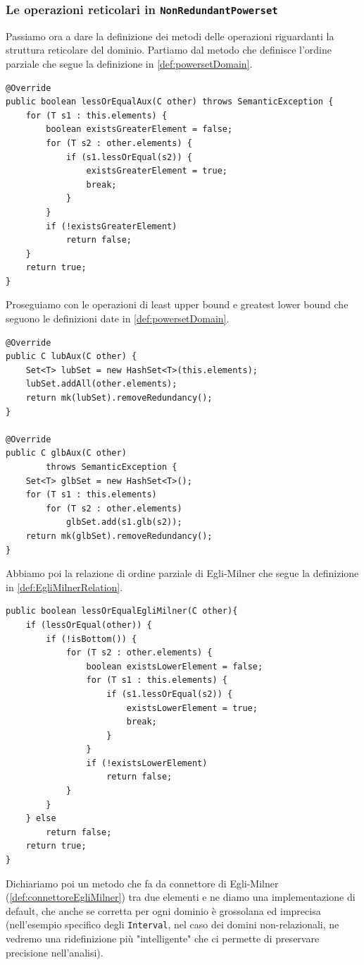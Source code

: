 \subsubsection{Le operazioni reticolari in \texttt{NonRedundantPowerset}}
Passiamo ora a dare la definizione dei metodi delle operazioni riguardanti la struttura reticolare del dominio. Partiamo dal metodo che definisce l'ordine parziale che segue la definizione in \ref{def:powersetDomain}.
\begin{lstlisting}[belowskip=-1.1 \baselineskip]
@Override
public boolean lessOrEqualAux(C other) throws SemanticException {
    for (T s1 : this.elements) {
        boolean existsGreaterElement = false;
        for (T s2 : other.elements) {
            if (s1.lessOrEqual(s2)) {
                existsGreaterElement = true;
                break;
            }
        }
        if (!existsGreaterElement)
            return false;
    }
    return true;
}
\end{lstlisting}
Proseguiamo con le operazioni di least upper bound e greatest lower bound che seguono le definizioni date in \ref{def:powersetDomain}.
\begin{lstlisting}[belowskip=-1.1 \baselineskip]
@Override
public C lubAux(C other) {
    Set<T> lubSet = new HashSet<T>(this.elements);
    lubSet.addAll(other.elements);
    return mk(lubSet).removeRedundancy();
}

@Override
public C glbAux(C other)
        throws SemanticException {
    Set<T> glbSet = new HashSet<T>();
    for (T s1 : this.elements)
        for (T s2 : other.elements)
            glbSet.add(s1.glb(s2));
    return mk(glbSet).removeRedundancy();
}
\end{lstlisting}
Abbiamo poi la relazione di ordine parziale di Egli-Milner che segue la definizione in \ref{def:EgliMilnerRelation}.
\begin{lstlisting}[belowskip=-1.1 \baselineskip]
public boolean lessOrEqualEgliMilner(C other){
    if (lessOrEqual(other)) {
        if (!isBottom()) {
            for (T s2 : other.elements) {
                boolean existsLowerElement = false;
                for (T s1 : this.elements) {
                    if (s1.lessOrEqual(s2)) {
                        existsLowerElement = true;
                        break;
                    }
                }
                if (!existsLowerElement)
                    return false;
            }
        }
    } else
        return false;
    return true;
}
\end{lstlisting}
Dichiariamo poi un metodo che fa da connettore di Egli-Milner (\ref{def:connettoreEgliMilner}) tra due elementi e ne diamo una implementazione di default, che anche se corretta per ogni dominio è grossolana ed imprecisa (nell'esempio specifico degli \texttt{Interval}, nel caso dei domini non-relazionali, ne vedremo una ridefinizione più "intelligente" che ci permette di preservare precisione nell'analisi).
